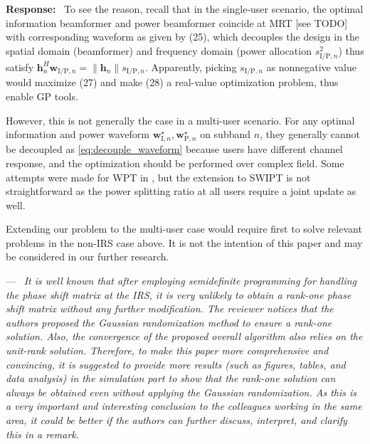 \documentclass{article}
\newcounter{reviewer}
\newcounter{point}[reviewer]
\renewcommand{\thepoint}
	{\thereviewer.\arabic{point}}
\newenvironment{point}
	{\refstepcounter{point} \bigskip \noindent {\textbf{Comment~\thepoint} } ---\ \itshape}
	{\par}
\newenvironment{response}
	{\medskip \noindent \textbf{Response:}\ }
	{\medskip}
\begin{document}
\begin{reviewersection}
\begin{response}
			To see the reason, recall that in the single-user scenario, the optimal information beamformer and power beamformer coincide at MRT [see TODO] with corresponding waveform as given by (25), which decouples the design in the spatial domain (beamformer) and frequency domain (power allocation $s_{\mathrm{I/P},n}^2$) thus satisfy $\boldsymbol{h}_n^H\boldsymbol{w}_{\mathrm{I/P},n}=\lVert{\boldsymbol{h}_n}\rVert s_{\mathrm{I/P},n}$. Apparently, picking $s_{\mathrm{I/P}, n}$ as nonnegative value would maximize (27) and make (28) a real-value optimization problem, thus enable GP tools.

			However, this is not generally the case in a multi-user scenario. For any optimal information and power waveform $\boldsymbol{w}_{\mathrm{I}, n}^{\star}, \boldsymbol{w}_{\mathrm{P}, n}^{\star}$ on subband $n$, they generally cannot be decoupled as \eqref{eq:decouple_waveform} because users have different channel response, and the optimization should be performed over complex field. Some attempts were made for WPT in \cite{Huang2017a}, but the extension to SWIPT is not straightforward as the power splitting ratio at all users require a joint update as well.

			Extending our problem to the multi-user case would require first to solve relevant problems in the non-IRS case above. It is not the intention of this paper and may be considered in our further research.
		\end{response}

		\begin{point}
			It is well known that after employing semidefinite programming for handling the phase shift matrix at the IRS, it is very unlikely to obtain a rank-one phase shift matrix without any further modification. The reviewer notices that the authors proposed the Gaussian randomization method to ensure a rank-one solution. Also, the convergence of the proposed overall algorithm also relies on the unit-rank solution. Therefore, to make this paper more comprehensive and convincing, it is suggested to provide more results (such as figures, tables, and data analysis) in the simulation part to show that the rank-one solution can always be obtained even without applying the Gaussian randomization. As this is a very important and interesting conclusion to the colleagues working in the same area, it could be better if the authors can further discuss, interpret, and clarify this in a remark.
		\end{point}


\end{reviewersection}
\end{document}
